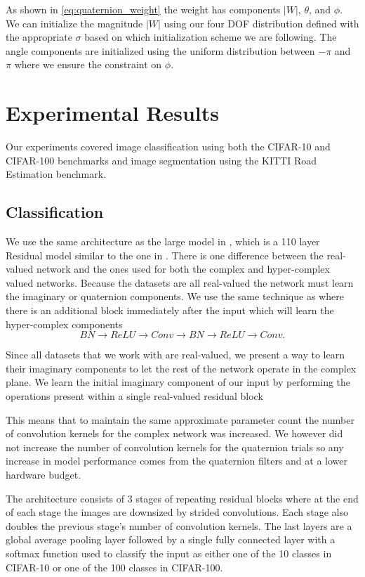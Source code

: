 \documentclass[conference]{IEEEtran}
\begin{document}
As shown in \eqref{eq:quaternion_weight} the weight has components $|W|$, $\theta$, and $\phi$. 
We can initialize the magnitude $|W|$ using our four DOF distribution defined with the appropriate $\sigma$ based on which initialization scheme we are following. 
The angle components are initialized using the uniform distribution between $-\pi$ and $\pi$ where we ensure the constraint on $\phi$.


\section{Experimental Results}
Our experiments covered image classification using both the CIFAR-10 and CIFAR-100 benchmarks and image segmentation using the KITTI Road Estimation benchmark.

\subsection{Classification}
We use the same architecture as the large model in \cite{trabelsi2017deep}, which is a 110 layer Residual model similar to the one in \cite{he2016deep}.
There is one difference between the real-valued network and the ones used for both the complex and hyper-complex valued networks.
Because the datasets are all real-valued the network must learn the imaginary or quaternion components.
We use the same technique as \cite{trabelsi2017deep} where there is an additional block immediately after the input which will learn the hyper-complex components
\begin{equation*}
BN \rightarrow ReLU \rightarrow Conv \rightarrow BN \rightarrow ReLU \rightarrow Conv.
\end{equation*}

Since all datasets that we work with are real-valued,
we present a way to learn their imaginary components to let the rest of the network operate in the
complex plane. 
We learn the initial imaginary component of our input by performing the operations
present within a single real-valued residual block

This means that to maintain the same approximate parameter count the number of convolution kernels for the complex network was increased.
We however did not increase the number of convolution kernels for the quaternion trials so any increase in model performance comes from the quaternion filters and at a lower hardware budget.

The architecture consists of 3 stages of repeating residual blocks where at the end of each stage the images are downsized by strided convolutions.
Each stage also doubles the previous stage's number of convolution kernels.
The last layers are a global average pooling layer followed by a single fully connected layer with a softmax function used to classify the input as either one of the 10 classes in CIFAR-10 or one of the 100 classes in CIFAR-100.
\end{document}
